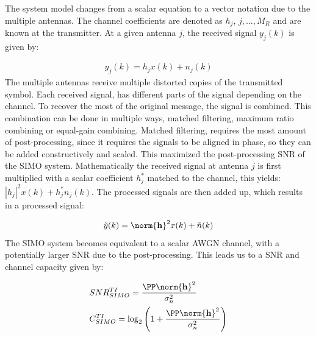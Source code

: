 The system model changes from a scalar equation to a vector notation due to the multiple antennas. The channel coefficients are denoted as $h_j$, $j,...,M_R$ and are known at the transmitter. At a given antenna $j$, the received signal $y_j(k)$ is given by: 

\begin{align*}
  y_j(k) = h_j x(k) + n_j(k)
\end{align*}
The multiple antennas receive multiple distorted copies of the transmitted symbol. Each received signal, has different parts of the signal depending on the channel. To recover the most of the original message, the signal is combined. This combination can be done in multiple ways, matched filtering, maximum ratio combining or equal-gain combining. Matched filtering, requires the most amount of post-processing, since it requires the signals to be aligned in phase, so they can be added constructively and scaled. This maximized the post-processing SNR of the SIMO system. Mathematically the received signal at antenna $j$ is first multiplied with a scalar coefficient $h_j^*$ matched to the channel, this yields: $|h_j|^2 x(k) + h_j^* n_j(k)$. The processed signals are then added up, which results in a processed signal\cite{Tim2012Practical}: 

\begin{align*}
  \tilde{y}(k) = \norm{\mathbf{h}}^2 x(k) + \tilde{n}(k)
\end{align*}
The SIMO system becomes equivalent to a scalar AWGN channel, with a potentially larger SNR due to the post-processing\cite{Tim2012Practical}. This leads us to a SNR and channel capacity given by: 

\begin{align*}
&SNR^{TI}_{SIMO} = \frac{\PP \norm{\mathbf{h}}^2}{\sigma^2_n} \\
&C^{TI}_{SIMO} = \log_2 \left( 1+\frac{\PP \norm{\mathbf{h}}^2}{\sigma^2_n} \right)  
\end{align*}

